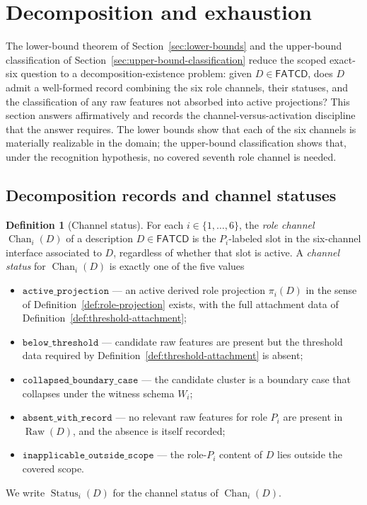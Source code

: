 \documentclass[11pt]{article}
\theoremstyle{definition}
\newtheorem{definition}[theorem]{Definition}
\newcommand{\FATCD}{\ensuremath{\mathsf{FATCD}}}
\newcommand{\Raw}[1]{\ensuremath{\operatorname{Raw}\!\left(#1\right)}}
\newcommand{\Chan}[2]{\ensuremath{\operatorname{Chan}_{#1}\!\left(#2\right)}}
\newcommand{\Status}[2]{\ensuremath{\operatorname{Status}_{#1}\!\left(#2\right)}}
\newcommand{\activeproj}{\texttt{active\_projection}}
\newcommand{\belowthr}{\texttt{below\_threshold}}
\newcommand{\collapsedbc}{\texttt{collapsed\_boundary\_case}}
\newcommand{\absentrec}{\texttt{absent\_with\_record}}
\newcommand{\outsidescope}{\texttt{inapplicable\_outside\_scope}}
\begin{document}
 \section{Decomposition and exhaustion}\label{sec:decomposition-exhaustion}




The lower-bound theorem of Section~\ref{sec:lower-bounds} and the
upper-bound classification of
Section~\ref{sec:upper-bound-classification} reduce the scoped
exact-six question to a decomposition-existence problem: given
\(D \in \FATCD{}\), does \(D\) admit a well-formed record combining
the six role channels, their statuses, and the classification of any
raw features not absorbed into active projections? This section
answers affirmatively and records the channel-versus-activation
discipline that the answer requires. The lower bounds show that each
of the six channels is materially realizable in the domain; the
upper-bound classification shows that, under the recognition hypothesis, no
covered seventh role channel is needed.

\subsection{Decomposition records and channel statuses}\label{subsec:dec-records}

\begin{definition}[Channel status]\label{def:channel-status}
For each \(i \in \{1,\ldots,6\}\), the \emph{role channel}
\(\Chan{i}{D}\) of a description \(D \in \FATCD{}\) is the
\(P_i\)-labeled slot in the six-channel interface associated to \(D\),
regardless of whether that slot is active. A \emph{channel status} for
\(\Chan{i}{D}\) is exactly one of the five values
\begin{itemize}[topsep=2pt,itemsep=1pt]
  \item \(\activeproj\) --- an active derived role projection
    \(\pi_i(D)\) in the sense of
    Definition~\ref{def:role-projection} exists, with the full
    attachment data of
    Definition~\ref{def:threshold-attachment};
  \item \(\belowthr\) --- candidate raw features are present but the
    threshold data required by
    Definition~\ref{def:threshold-attachment} is absent;
  \item \(\collapsedbc\) --- the candidate cluster is a boundary case
    that collapses under the witness schema \(W_i\);
  \item \(\absentrec\) --- no relevant raw features for role \(P_i\) are
    present in \(\Raw{D}\), and the absence is itself recorded;
  \item \(\outsidescope\) --- the role-\(P_i\) content of \(D\) lies
    outside the covered scope.
\end{itemize}
We write \(\Status{i}{D}\) for the channel status of \(\Chan{i}{D}\).
\end{definition}
\end{document}
